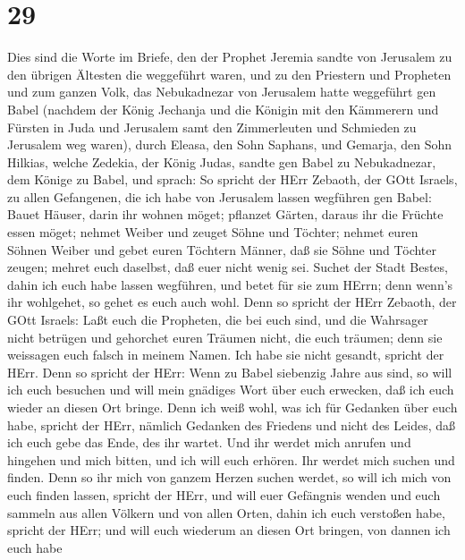 \hypertarget{section-28}{%
\section{29}\label{section-28}}

 Dies sind die Worte im Briefe, den der Prophet Jeremia
sandte von Jerusalem zu den übrigen Ältesten die weggeführt waren, und
zu den Priestern und Propheten und zum ganzen Volk, das Nebukadnezar von
Jerusalem hatte weggeführt gen Babel  (nachdem der König
Jechanja und die Königin mit den Kämmerern und Fürsten in Juda und
Jerusalem samt den Zimmerleuten und Schmieden zu Jerusalem weg waren),
 durch Eleasa, den Sohn Saphans, und Gemarja, den Sohn
Hilkias, welche Zedekia, der König Judas, sandte gen Babel zu
Nebukadnezar, dem Könige zu Babel, und sprach:  So spricht
der HErr Zebaoth, der GOtt Israels, zu allen Gefangenen, die ich habe
von Jerusalem lassen wegführen gen Babel:  Bauet Häuser,
darin ihr wohnen möget; pflanzet Gärten, daraus ihr die Früchte essen
möget;  nehmet Weiber und zeuget Söhne und Töchter; nehmet
euren Söhnen Weiber und gebet euren Töchtern Männer, daß sie Söhne und
Töchter zeugen; mehret euch daselbst, daß euer nicht wenig sei.
 Suchet der Stadt Bestes, dahin ich euch habe lassen
wegführen, und betet für sie zum HErrn; denn wenn's ihr wohlgehet, so
gehet es euch auch wohl.  Denn so spricht der HErr Zebaoth,
der GOtt Israels: Laßt euch die Propheten, die bei euch sind, und die
Wahrsager nicht betrügen und gehorchet euren Träumen nicht, die euch
träumen;  denn sie weissagen euch falsch in meinem Namen.
Ich habe sie nicht gesandt, spricht der HErr.  Denn so
spricht der HErr: Wenn zu Babel siebenzig Jahre aus sind, so will ich
euch besuchen und will mein gnädiges Wort über euch erwecken, daß ich
euch wieder an diesen Ort bringe.  Denn ich weiß wohl, was
ich für Gedanken über euch habe, spricht der HErr, nämlich Gedanken des
Friedens und nicht des Leides, daß ich euch gebe das Ende, des ihr
wartet.  Und ihr werdet mich anrufen und hingehen und mich
bitten, und ich will euch erhören.  Ihr werdet mich suchen
und finden. Denn so ihr mich von ganzem Herzen suchen werdet,
 so will ich mich von euch finden lassen, spricht der HErr,
und will euer Gefängnis wenden und euch sammeln aus allen Völkern und
von allen Orten, dahin ich euch verstoßen habe, spricht der HErr; und
will euch wiederum an diesen Ort bringen, von dannen ich euch habe
